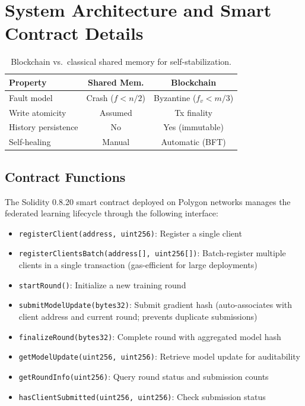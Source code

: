 
\section{System Architecture and Smart Contract Details}
\label{app:blockchain}

\begin{table}[htbp]
\centering\small
\caption{Blockchain vs.\ classical shared memory for self-stabilization.}
\label{tab:blockchain_vs_shmem}
\setlength{\tabcolsep}{4pt}
\begin{tabular}{|l|c|c|}
\hline
\textbf{Property} & \textbf{Shared Mem.} & \textbf{Blockchain} \\
\hline
Fault model & Crash ($f{<}n/2$) & Byzantine ($f_v{<}m/3$) \\
Write atomicity & Assumed & Tx finality \\
History persistence & No & Yes (immutable) \\
Self-healing & Manual & Automatic (BFT) \\
\hline
\end{tabular}
\end{table}

\subsection{Contract Functions}

The Solidity 0.8.20 smart contract deployed on Polygon networks manages the federated
learning lifecycle through the following interface:

\begin{itemize}
\item \texttt{registerClient(address, uint256)}: Register a single client
\item \texttt{registerClientsBatch(address[], uint256[])}: Batch-register multiple clients
  in a single transaction (gas-efficient for large deployments)
\item \texttt{startRound()}: Initialize a new training round
\item \texttt{submitModelUpdate(bytes32)}: Submit gradient hash (auto-associates with
  client address and current round; prevents duplicate submissions)
\item \texttt{finalizeRound(bytes32)}: Complete round with aggregated model hash
\item \texttt{getModelUpdate(uint256, uint256)}: Retrieve model update for auditability
\item \texttt{getRoundInfo(uint256)}: Query round status and submission counts
\item \texttt{hasClientSubmitted(uint256, uint256)}: Check submission status
\end{itemize}

